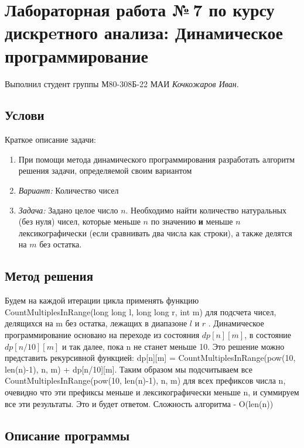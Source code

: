 \documentclass[12pt]{article}
\begin{document}
\section*{Лабораторная работа №\,7 по курсу дискрeтного анализа: Динамическое программирование}

Выполнил студент группы М80-308Б-22 МАИ \textit{Кочкожаров Иван}.

\subsection*{Услови}

Краткое описание задачи:
\begin{enumerate}
    \item При помощи метода динамического программирования разработать алгоритм решения задачи, определяемой
    своим вариантом
    \item \textit{Вариант:} Количество чисел
    \item \textit{Задача:} Задано целое число $n$. Необходимо найти количество натуральных (без нуля) чисел, которые меньше $n$ по значению \textbf{и} меньше $n$ лексикографически (если сравнивать два числа как строки), а также делятся на $m$ без остатка.
\end{enumerate}

\subsection*{Метод решения}

Будем на каждой итерации цикла применять функцию CountMultiplesInRange(long long l, long long r, int m) для подсчета чисел, делящихся на m без остатка, лежащих в диапазоне $l$ и $r$ . Динамическое программирование основано на переходе из состояния $dp[n][m]$, в состояние $dp[n/10][m]$ и так далее, пока n не станет меньше 10. 
Это решение можно представить рекурсивной функцией: dp[n][m] = CountMultiplesInRange(pow(10, len(n)-1), n, m) + dp[n/10][m]. Таким образом мы подсчитываем все CountMultiplesInRange(pow(10, len(n)-1), n, m) для всех префиксов числа n, очевидно что эти префиксы меньше и лексикографически меньше n, и суммируем все эти результаты. Это и будет ответом.
Сложность алгоритма - O(len(n))

\subsection*{Описание программы}
\end{document}
